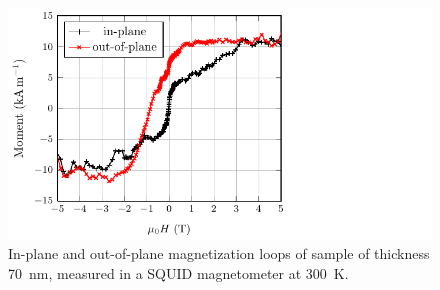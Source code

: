\documentclass[reprint,aip,apl,floatfix,linenumbers,superscriptaddress]{revtex4-1}
\begin{document}
\begin{figure}
\includegraphics[width=1.5\columnwidth]{Transport-Fig1.pdf}
\caption{In-plane and out-of-plane magnetization loops of  
sample of thickness \SI{70}{\nano\metre}, measured in a SQUID magnetometer at 
\SI{300}{\kelvin}.}
\label{fig:squid}
\end{figure}
\end{document}
